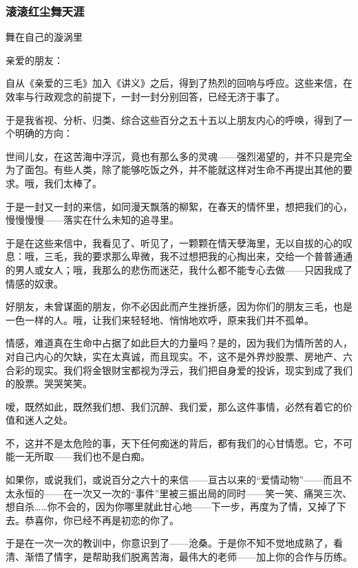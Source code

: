 \subsubsection{滚滚红尘舞天涯}

\begin{center}
    \par 舞在自己的漩涡里 
\end{center}
\par 亲爱的朋友：
\par 自从《亲爱的三毛》加入《讲义》之后，得到了热烈的回响与呼应。这些来信，在效率与行政观念的前提下，一封一封分别回答，已经无济于事了。
\par 于是我省视、分析、归类、综合这些百分之五十五以上朋友内心的呼唤，得到了一个明确的方向：
\par 世间儿女，在这苦海中浮沉，竟也有那么多的灵魂——强烈渴望的，并不只是完全为了面包。有些人类，除了能够吃饭之外，并不能就这样对生命不再提出其他的要求。哦，我们太棒了。
\par 于是一封又一封的来信，如同漫天飘落的柳絮，在春天的情怀里，想把我们的心，慢慢慢慢——落实在什么未知的追寻里。
\par 于是在这些来信中，我看见了、听见了，一颗颗在情天孽海里，无以自拔的心的叹息：哦，三毛，我的要求那么卑微，我不过想把我的心掏出来，交给一个普普通通的男人或女人；哦，我那么的悲伤而迷茫，我什么都不能专心去做——只因我成了情感的奴隶。
\par 好朋友，未曾谋面的朋友，你不必因此而产生挫折感，因为你们的朋友三毛，也是一色一样的人。哦，让我们来轻轻地、悄悄地欢呼，原来我们并不孤单。
\par 情感，难道真在生命中占据了如此巨大的力量吗？是的，因为我们为情所苦的人，对自己内心的欠缺，实在太真诚，而且现实。不，这不是外界炒股票、房地产、六合彩的现实。我们将金银财宝都视为浮云，我们把自身爱的投诉，现实到成了我们的股票。哭哭笑笑。
\par 嗳，既然如此，既然我们想、我们沉醉、我们爱，那么这件事情，必然有着它的价值和迷人之处。
\par 不，这并不是太危险的事，天下任何痴迷的背后，都有我们的心甘情愿。它，不可能一无所取——我们也不是白痴。
\par 如果你，或说我们，或说百分之六十的来信——亘古以来的“爱情动物”——而且不太永恒的——在一次又一次的“事件”里被三振出局的同时——笑一笑、痛哭三次、想自杀……你不会的，因为你哪里就此甘心地——下一步，再度为了情，又掉了下去。恭喜你，你已经不再是初恋的你了。
\par 于是在一次一次的教训中，你意识到了——沧桑。于是你不知不觉地成熟了，看清、渐悟了情字，是帮助我们脱离苦海，最伟大的老师——加上你的合作与历练。
